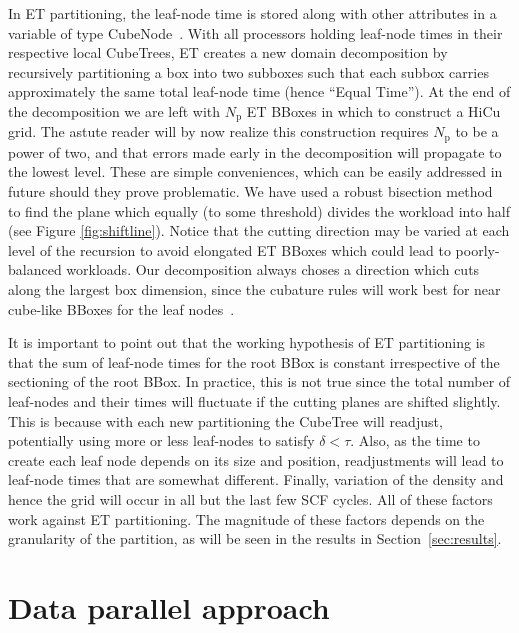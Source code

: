 \commentoutA{\documentclass[prb,aps,twocolumn,twocolumngrid]{revtex4}}
\newcommand{\Np}{N_{\mathrm{p}}} \newcommand{\Nbox}{N_{\mathrm{b}}}
\begin{document}
In ET partitioning, the leaf-node time is stored along with other
attributes in a variable of type CubeNode~\cite{MChallacombe00A}.
With all processors holding leaf-node times in their respective local
CubeTrees, ET creates a new domain decomposition by recursively
partitioning a box into two subboxes such that each subbox carries
approximately the same total leaf-node time (hence ``Equal Time'').
At the end of the decomposition we are left with $\Np$ ET BBoxes in
which to construct a HiCu grid.  The astute reader will by now realize
this construction requires $\Np$ to be a power of two, and that errors
made early in the decomposition will propagate to the lowest level.
These are simple conveniences, which can be easily addressed in future
should they prove problematic.  We have used a robust bisection
method~\cite{WPress92} to find the plane which equally (to some
threshold) divides the workload into half (see Figure
\ref{fig:shiftline}). Notice that the cutting direction may be varied
at each level of the recursion to avoid elongated ET BBoxes which
could lead to poorly-balanced workloads. Our decomposition always
choses a direction which cuts along the largest box dimension, since
the cubature rules will work best for near cube-like BBoxes for the
leaf nodes~\cite{Stroud71}.

It is important to point out that the working hypothesis of ET
partitioning is that the sum of leaf-node times for the root BBox is
constant irrespective of the sectioning of the root BBox.  In
practice, this is not true since the total number of leaf-nodes and
their times will fluctuate if the cutting planes are shifted
slightly. This is because with each new partitioning the CubeTree will
readjust, potentially using more or less leaf-nodes to satisfy
$\delta<\tau$.  Also, as the time to create each leaf node depends on
its size and position, readjustments will lead to leaf-node times that
are somewhat different. Finally, variation of the density and hence
the grid will occur in all but the last few SCF cycles.  All of these
factors work against ET partitioning.  The magnitude of these factors
depends on the granularity of the partition, as will be seen in the
results in Section~\ref{sec:results}.



\section{Data parallel approach}
\label{sec:data-locality}
\end{document}
